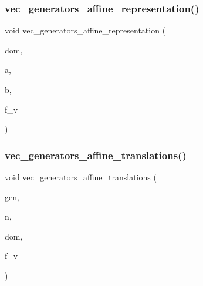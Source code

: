 \subsubsection{\texorpdfstring{vec\+\_\+generators\+\_\+affine\+\_\+representation()}{vec\_generators\_affine\_representation()}}
{\footnotesize\ttfamily void vec\+\_\+generators\+\_\+affine\+\_\+representation (\begin{DoxyParamCaption}\item[{\mbox{\hyperlink{classdomain}{domain}} $\ast$}]{dom,  }\item[{\mbox{\hyperlink{class_vector}{Vector}} \&}]{a,  }\item[{\mbox{\hyperlink{class_vector}{Vector}} \&}]{b,  }\item[{\mbox{\hyperlink{galois_8h_a09fddde158a3a20bd2dcadb609de11dc}{I\+NT}}}]{f\+\_\+v }\end{DoxyParamCaption})}

\mbox{\label{perm__group__gens_8_c_a7823a00ce1bf9cd69d1f9543e594e0e6}} 
\subsubsection{\texorpdfstring{vec\+\_\+generators\+\_\+affine\+\_\+translations()}{vec\_generators\_affine\_translations()}\hspace{0.1cm}{\footnotesize\ttfamily [1/2]}}
{\footnotesize\ttfamily void vec\+\_\+generators\+\_\+affine\+\_\+translations (\begin{DoxyParamCaption}\item[{\mbox{\hyperlink{class_vector}{Vector}} \&}]{gen,  }\item[{\mbox{\hyperlink{galois_8h_a09fddde158a3a20bd2dcadb609de11dc}{I\+NT}}}]{n,  }\item[{\mbox{\hyperlink{classdomain}{domain}} $\ast$}]{dom,  }\item[{\mbox{\hyperlink{galois_8h_a09fddde158a3a20bd2dcadb609de11dc}{I\+NT}}}]{f\+\_\+v }\end{DoxyParamCaption})}

\mbox{\label{perm__group__gens_8_c_ac4f5e1074cf38552f67cd4ed6deba6ea}} 

